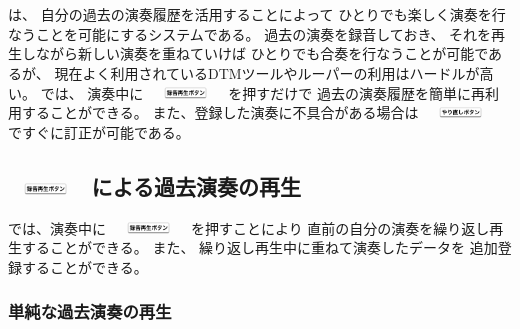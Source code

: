 %
%
\section{\system}
\label{repiano}

{\system}は、
自分の過去の演奏履歴を活用することによって
ひとりでも楽しく演奏を行なうことを可能にするシステムである。
%
過去の演奏を録音しておき、
それを再生しながら新しい演奏を重ねていけば
ひとりでも合奏を行なうことが可能であるが、
現在よく利用されているDTMツールやルーパーの利用はハードルが高い。
{\system}では、
演奏中に
\includegraphics[height=3mm,width=20mm,bb=3 23 360 80]{images/recbutton.png}
を押すだけで
過去の演奏履歴を簡単に再利用することができる。
また、登録した演奏に不具合がある場合は
\includegraphics[height=3mm,width=20mm,bb=3 23 360 80]{images/undobutton.png}
ですぐに訂正が可能である。

\subsection{\protect\includegraphics[height=3mm,width=20mm,bb=3 23 360 80]{images/recbutton.png} による過去演奏の再生}
\label{recplaybutton}

{\system}では、演奏中に
\includegraphics[height=3mm,width=20mm,bb=3 23 360 80]{images/recbutton.png}
を押すことにより
直前の自分の演奏を繰り返し再生することができる。
また、
繰り返し再生中に重ねて演奏したデータを
追加登録することができる。

\subsubsection{単純な過去演奏の再生}

